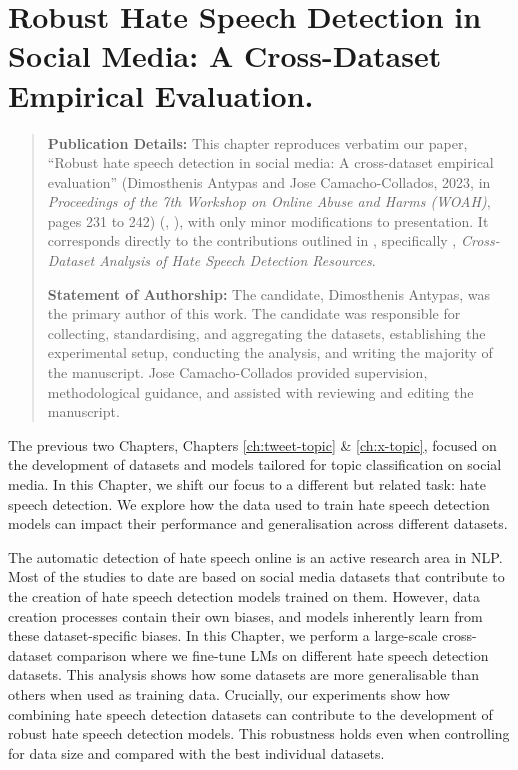 \setlength{\headheight}{27.2pt}
\chapter{Robust Hate Speech Detection in Social Media: A Cross-Dataset Empirical Evaluation.}
\label{ch:hate-speech}

\begin{quote}
\textbf{Publication Details:} This chapter reproduces verbatim our paper, ``Robust hate speech detection in social media: A cross-dataset empirical evaluation'' (Dimosthenis Antypas and Jose Camacho-Collados, 2023, in \textit{Proceedings of the 7th Workshop on Online Abuse and Harms (WOAH)}, pages 231 to 242) (, ), with only minor modifications to presentation. It corresponds directly to the contributions outlined in , specifically , \textit{Cross-Dataset Analysis of Hate Speech Detection Resources}.

\textbf{Statement of Authorship:} The candidate, Dimosthenis Antypas, was the primary author of this work. The candidate was responsible for collecting, standardising, and aggregating the datasets, establishing the experimental setup, conducting the analysis, and writing the majority of the manuscript. Jose Camacho-Collados provided supervision, methodological guidance, and assisted with reviewing and editing the manuscript.
\end{quote}

The previous two Chapters, Chapters \ref{ch:tweet-topic} \& \ref{ch:x-topic}, focused on the development of datasets and models tailored for topic classification on social media. In this Chapter, we shift our focus to a different but related task: hate speech detection. We explore how the data used to train hate speech detection models can impact their performance and generalisation across different datasets. 

The automatic detection of hate speech online is an active research area in \ac{NLP}. Most of the studies to date are based on social media datasets that contribute to the creation of hate speech detection models trained on them. However, data creation processes contain their own biases, and models inherently learn from these dataset-specific biases. In this Chapter, we perform a large-scale cross-dataset comparison where we fine-tune \acp{LM} on different hate speech detection datasets. This analysis shows how some datasets are more generalisable than others when used as training data. Crucially, our experiments show how combining hate speech detection datasets can contribute to the development of robust hate speech detection models. This robustness holds even when controlling for data size and compared with the best individual datasets. 

